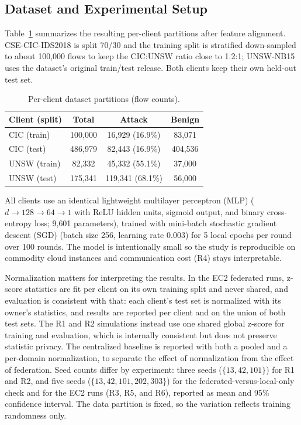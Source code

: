 \documentclass[conference]{IEEEtran}
\begin{document}
\subsection{Dataset and Experimental Setup}
Table~\ref{tab:dataset} summarizes the resulting per-client partitions after feature
alignment. CSE-CIC-IDS2018 is split 70/30 and the training split is stratified
down-sampled to about 100{,}000 flows to keep the CIC:UNSW ratio close to 1.2:1;
UNSW-NB15 uses the dataset's original train/test release. Both clients keep their own held-out test set.

\begin{table}[htbp]
\caption{Per-client dataset partitions (flow counts).}
\label{tab:dataset}
\begin{center}
\footnotesize
\begin{tabular}{|l|c|c|c|}
\hline
\textbf{Client (split)} & \textbf{Total} & \textbf{Attack} & \textbf{Benign} \\
\hline
CIC (train) & 100{,}000 & 16{,}929 (16.9\%) & 83{,}071 \\
CIC (test)  & 486{,}979 & 82{,}443 (16.9\%) & 404{,}536 \\
UNSW (train)& 82{,}332  & 45{,}332 (55.1\%) & 37{,}000 \\
UNSW (test) & 175{,}341 & 119{,}341 (68.1\%)& 56{,}000 \\
\hline
\end{tabular}
\end{center}
\end{table}

All clients use an identical lightweight multilayer perceptron (MLP) ($d{\to}128{\to}64{\to}1$ with ReLU hidden
units, sigmoid output, and binary cross-entropy loss; 9{,}601 parameters), trained with
mini-batch stochastic gradient descent (SGD) (batch size 256, learning rate 0.003) for 5 local epochs per round over 100
rounds. The model is intentionally small so the study is reproducible on commodity cloud
instances and communication cost (R4) stays interpretable.

Normalization matters for interpreting the results. In the EC2 federated runs, z-score
statistics are fit per client on its own training split and never shared, and evaluation
is consistent with that: each client's test set is normalized with its owner's statistics,
and results are reported per client and on the union of both test sets. The R1 and R2
simulations instead use one shared global z-score for training and evaluation, which is
internally consistent but does not preserve statistic privacy. The centralized baseline is
reported with both a pooled and a per-domain normalization, to separate the effect of
normalization from the effect of federation. Seed counts differ by experiment: three seeds ($\{13,42,101\}$) for R1 and R2, and five
seeds ($\{13,42,101,202,303\}$) for the federated-versus-local-only check and for the EC2 runs
(R3, R5, and R6), reported as mean and 95\% confidence interval. The data partition is fixed,
so the variation reflects training randomness only.
\end{document}
